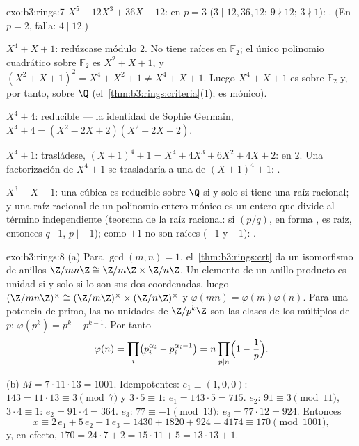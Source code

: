 \begin{solution}{exo:b3:rings:7}
\emph{$X^5 - 12X^3 + 36X - 12$}:
 en $p = 3$ ($3 \mid
12, 36, 12$; $9 \nmid 12$; $3 \nmid 1$):
. (En $p = 2$,
 falla: $4 \mid 12$.)

\emph{$X^4 + X + 1$}: redúzcase módulo $2$. No tiene raíces en
$\mathbb F_2$; el único polinomio cuadrático
 sobre $\mathbb F_2$ es
$X^2 + X +
1$, y $(X^2+X+1)^2 = X^4 + X^2 + 1 \neq X^4 + X + 1$. Luego $X^4 +
X + 1$ es  sobre
$\mathbb F_2$ y, por tanto, sobre $\Q$
(el~\cref{thm:b3:rings:criteria}(1); es mónico).

\emph{$X^4 + 4$}: reducible --- la identidad de Sophie Germain,
$X^4 + 4 = (X^2 - 2X + 2)(X^2 + 2X + 2)$.

\emph{$X^4 + 1$}: trasládese, $(X+1)^4 + 1 = X^4 + 4X^3 + 6X^2 + 4X +
2$:  en $2$. Una factorización
de $X^4+1$ se trasladaría a una de $(X+1)^4 + 1$:
.

\emph{$X^3 - X - 1$}: una cúbica es reducible sobre $\Q$ si y solo si
tiene una raíz racional; y una raíz racional de un polinomio entero
mónico es un entero que divide al término independiente (teorema de la
raíz racional: si $(p/q)$, en forma , es raíz, entonces
$q \mid 1$, $p \mid -1$); como $\pm 1$ no son raíces ($-1$ y $-1$):
.
\end{solution}

\begin{solution}{exo:b3:rings:8}
(a) Para $\gcd(m, n) = 1$, el~\cref{thm:b3:rings:crt} da un isomorfismo
de anillos $\Z/mn\Z \cong \Z/m\Z \times \Z/n\Z$. Un elemento de un
anillo producto es unidad si y solo si lo son sus dos coordenadas, luego
$(\Z/mn\Z)^\times \cong (\Z/m\Z)^\times \times (\Z/n\Z)^\times$
y $\varphi(mn) = \varphi(m)\varphi(n)$. Para una potencia de primo, las
no unidades de $\Z/p^k\Z$ son las clases de los múltiplos de $p$:
$\varphi(p^k) = p^k - p^{k-1}$. Por tanto
\[
\varphi(n) = \prod_i \bigl(p_i^{\alpha_i} -
p_i^{\alpha_i-1}\bigr) = n \prod_{p \mid n}\Bigl(1 -
\frac1p\Bigr).
\]

(b) $M = 7 \cdot 11 \cdot 13 = 1001$. Idempotentes: $e_1 \equiv
(1, 0, 0)$: $143 = 11\cdot13 \equiv 3 \pmod 7$ y $3 \cdot 5
\equiv 1$: $e_1 = 143 \cdot 5 = 715$. $e_2$: $91 \equiv 3
\pmod{11}$, $3 \cdot 4 \equiv 1$: $e_2 = 91\cdot4 = 364$. $e_3$:
$77 \equiv -1 \pmod{13}$: $e_3 = 77 \cdot 12 = 924$. Entonces
\[
x \equiv 2\,e_1 + 5\,e_2 + 1\,e_3 = 1430 + 1820 + 924 = 4174
\equiv 170 \pmod{1001},
\]
y, en efecto, $170 = 24\cdot7 + 2 = 15\cdot11 + 5 = 13\cdot13 + 1$.
\end{solution}

